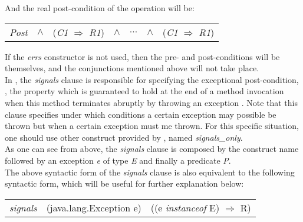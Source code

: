 And the real post-condition of the operation will be:

\begin{center}
\begin{tabular}{ccccccc}
\textit{Post} & $\land$ & (\textit{C1} $\Rightarrow$ \textit{R1}) & $\land$ & $\ldots$ & $\land$ & (\textit{C1} $\Rightarrow$ \textit{R1})\\
\end{tabular}
\end{center}

If the \textit{errs} constructor is not used, then the pre- and post-conditions will be themselves, and the conjunctions mentioned above will not take place.\\
In \jml, the \textit{signals} clause is responsible for specifying the exceptional post-condition, \ie, the property which is guaranteed to hold at the end of a method invocation when this method terminates abruptly by throwing an exception \cite{leavens-etal07}.
Note that this clause specifies under which conditions a certain exception may possible be thrown but when a certain exception must me thrown. For this specific situation, one should use other construct provided by \jml, named \textit{signals\_only}.\\
As one can see from above, the \textit{signals} clause is composed by the construct name followed by an exception \textit{e} of type \textit{E} and finally a predicate \textit{P}.\\
The above syntactic form of the \textit{signals} clause is also equivalent to the following syntactic form, which will be useful for further explanation below:

\begin{center}
\begin{tabular}{lll}
\textit{signals} & (java.lang.Exception e) & ((e \textit{instanceof} E) $\Rightarrow$ R)\\
\end{tabular}
\end{center}


